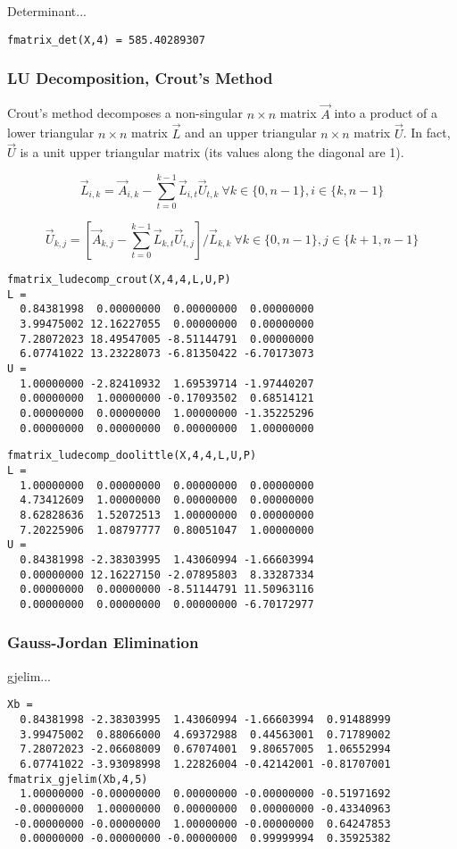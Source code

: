 Determinant...
\begin{verbatim}
fmatrix_det(X,4) = 585.40289307
\end{verbatim}

\subsubsection{LU Decomposition, Crout's Method}
Crout's method decomposes a non-singular $n\times n$ matrix $\vec{A}$ into a
product of a lower triangular $n \times n$ matrix $\vec{L}$ and an upper
triangular $n \times n$ matrix $\vec{U}$. %
In fact, $\vec{U}$ is a unit upper triangular matrix (its values along the
diagonal are 1).

\[
    \vec{L}_{i,k} = \vec{A}_{i,k} -
                    \sum_{t=0}^{k-1}{ \vec{L}_{i,t} \vec{U}_{t,k} }
                    \ \forall k \in \{0,n-1\}, i \in \{k,n-1\}
\]

\[
    \vec{U}_{k,j} = \left[
                    \vec{A}_{k,j} -
                    \sum_{t=0}^{k-1}{ \vec{L}_{k,t} \vec{U}_{t,j} }
                    \right] / \vec{L}_{k,k}
                    \ \forall k \in \{0,n-1\}, j \in \{k+1,n-1\}
\]

\begin{verbatim}
fmatrix_ludecomp_crout(X,4,4,L,U,P)
L =
  0.84381998  0.00000000  0.00000000  0.00000000
  3.99475002 12.16227055  0.00000000  0.00000000
  7.28072023 18.49547005 -8.51144791  0.00000000
  6.07741022 13.23228073 -6.81350422 -6.70173073
U =
  1.00000000 -2.82410932  1.69539714 -1.97440207
  0.00000000  1.00000000 -0.17093502  0.68514121
  0.00000000  0.00000000  1.00000000 -1.35225296
  0.00000000  0.00000000  0.00000000  1.00000000
\end{verbatim}

\begin{verbatim}
fmatrix_ludecomp_doolittle(X,4,4,L,U,P)
L =
  1.00000000  0.00000000  0.00000000  0.00000000
  4.73412609  1.00000000  0.00000000  0.00000000
  8.62828636  1.52072513  1.00000000  0.00000000
  7.20225906  1.08797777  0.80051047  1.00000000
U =
  0.84381998 -2.38303995  1.43060994 -1.66603994
  0.00000000 12.16227150 -2.07895803  8.33287334
  0.00000000  0.00000000 -8.51144791 11.50963116
  0.00000000  0.00000000  0.00000000 -6.70172977
\end{verbatim}

\subsubsection{Gauss-Jordan Elimination}

gjelim...
\begin{verbatim}
Xb =
  0.84381998 -2.38303995  1.43060994 -1.66603994  0.91488999
  3.99475002  0.88066000  4.69372988  0.44563001  0.71789002
  7.28072023 -2.06608009  0.67074001  9.80657005  1.06552994
  6.07741022 -3.93098998  1.22826004 -0.42142001 -0.81707001
fmatrix_gjelim(Xb,4,5)
  1.00000000 -0.00000000  0.00000000 -0.00000000 -0.51971692
 -0.00000000  1.00000000  0.00000000  0.00000000 -0.43340963
 -0.00000000 -0.00000000  1.00000000 -0.00000000  0.64247853
  0.00000000 -0.00000000 -0.00000000  0.99999994  0.35925382
\end{verbatim}

